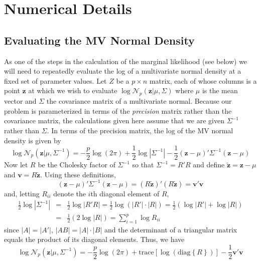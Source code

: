 \documentclass[12pt]{article}
\begin{document}
\section{Numerical Details}

\subsection{Evaluating the MV Normal Density}
As one of the steps in the calculation of the marginal likelihood (see below) we will need to repeatedly evaluate the log of a multivariate normal density at a fixed set of parameter values.
Let $Z$ be a $p\times n$ matrix, each of whose columns is a point $\mathbf{z}$ at which we wish to evaluate 
$\log {\mathcal{N}_p\left(\mathbf{z}|\mu, \Sigma \right)}$
where $\mu$ is the mean vector and $\Sigma$ the covariance matrix of a multivariate normal.
Because our problem is parameterized in terms of the \emph{precision} matrix rather than the covariance matrix, the calculations given here assume that we are given $\Sigma^{-1}$ rather than $\Sigma$.
In terms of the precision matrix, the log of the MV normal density is given by
\begin{equation*}
  \log {\mathcal{N}_p\left(\mathbf{z}|\mu, \Sigma^{-1} \right)} = -\frac{p}{2}\log\left( 2\pi \right) + \frac{1}{2} \log \left| \Sigma^{-1} \right| - \frac{1}{2} \left(\mathbf{z} - \mu \right)' \Sigma^{-1} \left( \mathbf{z} - \mu \right)
\end{equation*}
Now let $R$ be the Cholesky factor of $\Sigma^{-1}$ so that $\Sigma^{-1} = R'R$ and define $\tilde{\mathbf{z}} = \mathbf{z} - \mu$ and $\mathbf{v} = R\tilde{\mathbf{z}}$.
Using these definitions,
\begin{equation*}
  \left( \mathbf{z} - \mu \right)' \Sigma^{-1} \left( \mathbf{z} - \mu \right) = (R\tilde{\mathbf{z}})'(R\tilde{\mathbf{z}}) = \mathbf{v}' \mathbf{v}
\end{equation*}
and, letting $R_{ii}$ denote the $i$th diagonal element of $R$,
\begin{eqnarray*}
  \frac{1}{2}\log |\Sigma^{-1}| &=&  \frac{1}{2}\log |R'R| = \frac{1}{2}\log\left(|R'| \cdot |R|\right) = \frac{1}{2}\left(\log |R'| + \log |R| \right)\\
  &=&\frac{1}{2}\left( 2 \log|R|\right)=  \sum_{i=1}^{p} \log R_{ii}
\end{eqnarray*} 
since $|A| = |A'|$, $|AB| = |A| \cdot |B|$ and the determinant of a triangular matrix equals the product of its diagonal elements.
Thus, we have
\begin{equation*}
  \log {\mathcal{N}_p\left(\mathbf{z}|\mu, \Sigma^{-1} \right)} = -\frac{p}{2}\log\left( 2\pi \right) + \mbox{trace}\left[\log \left(\mbox{diag}\left\{R  \right\}  \right)\right] - \frac{1}{2} \mathbf{v}'\mathbf{v}
\end{equation*}
\end{document}
